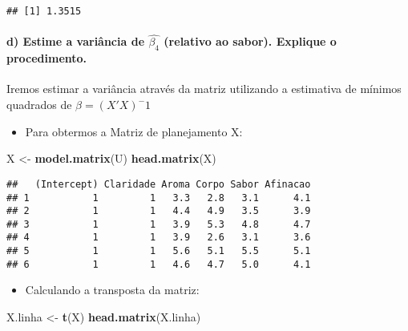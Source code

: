 \documentclass[
]{article}
\newenvironment{Shaded}{\begin{snugshade}}{\end{snugshade}}
\newcommand{\KeywordTok}[1]{\textcolor[rgb]{0.13,0.29,0.53}{\textbf{#1}}}
\newcommand{\NormalTok}[1]{#1}
\newcommand{\StringTok}[1]{\textcolor[rgb]{0.31,0.60,0.02}{#1}}
\providecommand{\tightlist}{%
  \setlength{\itemsep}{0pt}\setlength{\parskip}{0pt}}
\begin{document}
\begin{verbatim}
## [1] 1.3515
\end{verbatim}

\hypertarget{d-estime-a-variuxe2ncia-de-widehatbeta_4-relativo-ao-sabor.-explique-o-procedimento.}{%
\paragraph{\texorpdfstring{\textbf{d) Estime a variância de
\(\widehat{\beta_4}\) (relativo ao sabor). Explique o
procedimento.}}{d) Estime a variância de \textbackslash widehat\{\textbackslash beta\_4\} (relativo ao sabor). Explique o procedimento.}}\label{d-estime-a-variuxe2ncia-de-widehatbeta_4-relativo-ao-sabor.-explique-o-procedimento.}}

Iremos estimar a variância através da matriz utilizando a estimativa de
mínimos quadrados de \(\beta = (X'X)^-1\)

\begin{itemize}
\tightlist
\item
  Para obtermos a Matriz de planejamento X:
\end{itemize}

\begin{Shaded}
\begin{Highlighting}[]
\NormalTok{X <-}\StringTok{ }\KeywordTok{model.matrix}\NormalTok{(U)}
\KeywordTok{head.matrix}\NormalTok{(X)}
\end{Highlighting}
\end{Shaded}

\begin{verbatim}
##   (Intercept) Claridade Aroma Corpo Sabor Afinacao
## 1           1         1   3.3   2.8   3.1      4.1
## 2           1         1   4.4   4.9   3.5      3.9
## 3           1         1   3.9   5.3   4.8      4.7
## 4           1         1   3.9   2.6   3.1      3.6
## 5           1         1   5.6   5.1   5.5      5.1
## 6           1         1   4.6   4.7   5.0      4.1
\end{verbatim}

\begin{itemize}
\tightlist
\item
  Calculando a transposta da matriz:
\end{itemize}

\begin{Shaded}
\begin{Highlighting}[]
\NormalTok{X.linha <-}\StringTok{ }\KeywordTok{t}\NormalTok{(X)}
\KeywordTok{head.matrix}\NormalTok{(X.linha)}
\end{Highlighting}
\end{Shaded}
\end{document}
